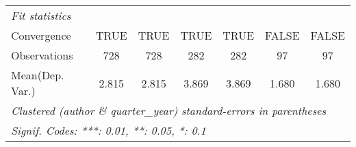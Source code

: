 \begin{tabular}{lcccccc}
   \midrule
   \emph{Fit statistics}\\
   Convergence                           &TRUE          & TRUE         & TRUE        & TRUE        & FALSE          & FALSE\\  
   Observations                          & 728          & 728          & 282         & 282         & 97             & 97\\  
Mean(Dep. Var.) & 2.815 & 2.815 & 3.869 & 3.869 & 1.680 & 1.680 \\
   \midrule \midrule
   \multicolumn{7}{l}{\emph{Clustered (author \& quarter\_year) standard-errors in parentheses}}\\
   \multicolumn{7}{l}{\emph{Signif. Codes: ***: 0.01, **: 0.05, *: 0.1}}\\
\end{tabular}
\par\endgroup
